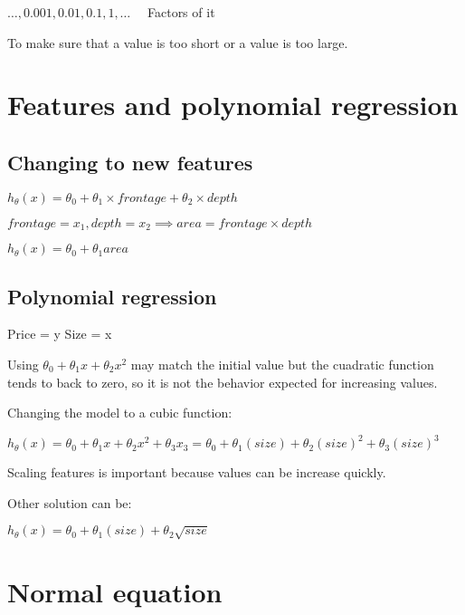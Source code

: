 \documentclass[a4paper]{report}
\begin{document}
          $\ldots, 0.001, 0.01, 0.1, 1, \ldots$ \ \ Factors of it

          To make sure that a value is too short or a value is too large.

    \section{Features and polynomial regression}

      \subsection{Changing to new features}

        $h_{\theta}(x) = \theta_{0} + \theta_{1} \times frontage + \theta_{2} \times depth$

        $frontage = x_{1}, depth = x_{2} \implies area = frontage \times depth$

        $h_{\theta}(x) = \theta_{0} + \theta_{1}area$

      \subsection{Polynomial regression}

        Price = y
        Size = x

        Using $\theta_{0} + \theta_{1}x + \theta_{2}x^{2}$ may match the initial value but the cuadratic function tends to back to zero, so it is not the behavior expected for increasing values.

        Changing the model to a cubic function:

        $h_{\theta}(x) = \theta_{0} + \theta_{1}x + \theta_{2}x^{2} + \theta_{3}x_{3} = \theta_{0} + \theta_{1}(size) + \theta_{2}(size)^{2} + \theta_{3}(size)^{3}$

        Scaling features is important because values can be increase quickly.

        Other solution can be:

        $h_{\theta}(x) = \theta_{0} + \theta_{1}(size) + \theta_{2}\sqrt{size}$

    \section{Normal equation}

      
\end{document}
